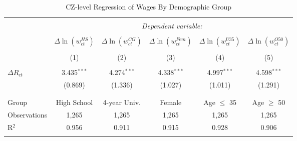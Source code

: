 
\begin{table}[!t] \centering 
  \caption{CZ-level Regression of Wages By Demographic Group} 
  \label{cz_tab_8_panel_C} 
\begin{tabular}{@{\extracolsep{5pt}}lccccc} 
\\[-1.8ex]\hline 
\hline \\[-1.8ex] 
 & \multicolumn{5}{c}{\textit{Dependent variable:}} \\ 
\cline{2-6} 
\\[-1.8ex] & $\Delta \ln(w^{HS}_{ct})$ & $\Delta \ln(w^{CG}_{ct})$ & $\Delta \ln(w^{Fem}_{ct})$ & $\Delta \ln(w^{U35}_{ct})$ & $\Delta \ln(w^{O50}_{ct})$ \\ 
\\[-1.8ex] & (1) & (2) & (3) & (4) & (5)\\ 
\hline \\[-1.8ex] 
 $\Delta R_{ct}$ & 3.435$^{***}$ & 4.274$^{***}$ & 4.338$^{***}$ & 4.997$^{***}$ & 4.598$^{***}$ \\ 
  & (0.869) & (1.336) & (1.027) & (1.011) & (1.291) \\ 
  & & & & & \\ 
\hline \\[-1.8ex] 
Group & High School & 4-year Univ. & Female & Age $\leq$ 35 & Age $\geq$ 50 \\ 
Observations & 1,265 & 1,265 & 1,265 & 1,265 & 1,265 \\ 
R$^{2}$ & 0.956 & 0.911 & 0.915 & 0.928 & 0.906 \\ 
\hline 
\hline \\[-1.8ex] 
\end{tabular} 
\end{table} 
